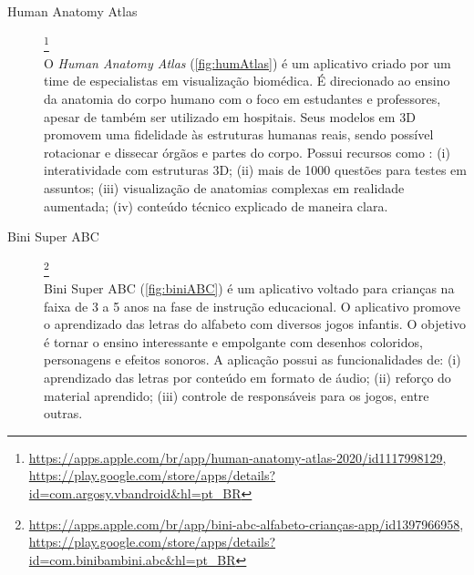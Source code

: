 \begin{description}
    

\item[Human Anatomy Atlas]\footnote{\url{https://apps.apple.com/br/app/human-anatomy-atlas-2020/id1117998129}, \url{https://play.google.com/store/apps/details?id=com.argosy.vbandroid&hl=pt_BR}} \hfill \\
O \textit{Human Anatomy Atlas} (\autoref{fig:humAtlas}) é um aplicativo criado por um time de especialistas em visualização biomédica. É direcionado ao ensino da anatomia do corpo humano com o foco em estudantes e professores, apesar de também ser utilizado em hospitais. Seus modelos em 3D promovem uma fidelidade às estruturas humanas reais, sendo possível rotacionar e dissecar órgãos e partes do corpo. Possui recursos como : (i) interatividade com estruturas 3D; (ii) mais de 1000 questões para testes em assuntos; (iii) visualização de anatomias complexas em realidade aumentada; (iv) conteúdo técnico explicado de maneira clara.

    

\item[Bini Super ABC]\footnote{\url{https://apps.apple.com/br/app/bini-abc-alfabeto-crianças-app/id1397966958}, \url{https://play.google.com/store/apps/details?id=com.binibambini.abc&hl=pt_BR}} \hfill \\
Bini Super ABC (\autoref{fig:biniABC}) é um aplicativo voltado para crianças na faixa de 3 a 5 anos na fase de instrução educacional. O aplicativo promove o aprendizado das letras do alfabeto com diversos jogos infantis. O objetivo é tornar o ensino interessante e empolgante com desenhos coloridos, personagens e efeitos sonoros. A aplicação possui as funcionalidades de: (i) aprendizado das letras por conteúdo em formato de áudio; (ii) reforço do material aprendido; (iii) controle de responsáveis para os jogos, entre outras.

    

\end{description}
